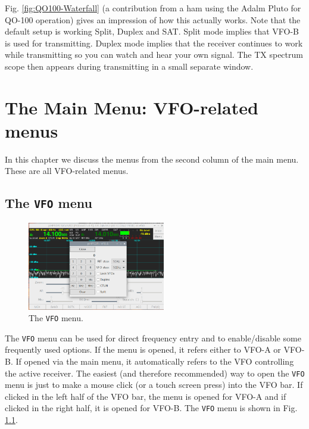 \documentclass[12pt]{book}
\def\bltt#1{\texttt{\color{blue}#1}}
\begin{document}
Fig. \ref{fig:QO100-Waterfall} (a contribution from a ham using the Adalm Pluto for QO-100
operation) gives an impression of how this actually works.
Note that the
default setup
is working Split, Duplex and SAT. Split mode implies that VFO-B is used for transmitting.
Duplex mode implies that the receiver continues to work while transmitting so you can watch
and hear your own signal.
The TX spectrum scope then appears during transmitting in a small separate window.

\chapter[VFO-related menus]{The Main Menu: VFO-related menus}

In this chapter we discuss the menus from the second column
of the main menu. These are all VFO-related menus.


\section{The \texttt{VFO}  menu}
\label{sec:vfomenu}

\begin{figure}[ht]
\center
\includegraphics[width=6cm]{VFOmenu.png}
\caption{The \bltt{VFO} menu.}
\label{fig:VFOmenu}
\end{figure}

The \bltt{VFO} menu can be used for direct frequency entry and to
enable/disable some frequently used options. If the menu is opened,
it refers either to VFO-A or VFO-B. If opened via the main menu,
it automatically refers to the VFO controlling the active receiver.
The easiest (and therefore recommended) way to open the \bltt{VFO}
menu is just to make a mouse click (or a touch screen press) into the
VFO bar. If clicked in the left half of the VFO bar, the menu is opened
for VFO-A and if clicked in the right half, it is opened for VFO-B.
The \bltt{VFO} menu is shown in Fig. \ref{fig:VFOmenu}.
\end{document}
